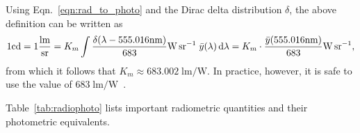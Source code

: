 Using Eqn.~\eqref{eqn:rad_to_photo} and the Dirac delta distribution $\delta$, the
above definition can be written as
\begin{displaymath}
    1 \si{\candela} = 1\frac{\si{\lumen}}{\si{\steradian}} 
    = K_m \int \frac{\delta(\lambda-555.016\si{\nano\meter})}{683} \si{\watt\per\steradian}\;\bar y(\lambda) \d\lambda
    = K_m \cdot \frac{\bar y(555.016\si{\nano\meter})}{683}\si{\watt\per\steradian},
\end{displaymath}
from which it follows that $K_m \approx 683.002 \;\si{\lumen\per\watt}$. In 
practice, however, it is safe to use the value of $683\;\si{\lumen\per\watt}$~\citep{cie1996,wyszecki2000}.

Table~\ref{tab:radiophoto} lists important radiometric quantities and their photometric equivalents.

